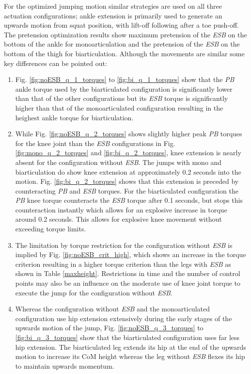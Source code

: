 \documentclass[letterpaper, 10 pt, conference]{ieeeconf}  %
\begin{document}
 For the optimized jumping motion similar strategies are used on all three actuation configurations; ankle extension is primarily used to generate an upwards motion from squat position, with lift-off following after a toe push-off. The pretension optimization results show maximum pretension of the \textit{ESB} on the bottom of the ankle for monoarticulation and the pretension of the \textit{ESB} on the bottom of the thigh for biarticulation. Although the movements are similar some key differences can be pointed out:
 \begin{enumerate}
 \item Fig. \ref{fig:noESB_q_1_torques} to \ref{fig:bi_q_1_torques} show that the \textit{PB} ankle torque used by the biarticulated configuration is significantly lower than that of the other configurations but its \textit{ESB} torque is significantly higher than that of the monoarticulated configuration resulting in the heighest ankle torque for biarticulation. 
 
\item While Fig. \ref{fig:noESB_q_2_torques} shows slightly higher peak \textit{PB} torques for the knee joint than the \textit{ESB} configurations in Fig. \ref{fig:mono_q_2_torques} and \ref{fig:bi_q_2_torques}, knee extension is nearly absent for the configuration without \textit{ESB}. The jumps with mono and biarticulation do show knee extension at approximately 0.2 seconds into the motion. Fig. \ref{fig:bi_q_2_torques} shows that this extension is preceded by counteracting \textit{PB} and \textit{ESB} torques. For the biarticulated configuration the \textit{PB} knee torque counteracts the \textit{ESB} torque after 0.1 seconds, but stops this counteraction instantly which allows for an explosive increase in torque around 0.2 seconds. This allows for explosive knee movement without exceeding torque limits.

\item The limitation by torque restriction for the configuration without \textit{ESB} is implied by Fig. \ref{fig:noESB_crit_high}, which shows an increase in the torque criterion resulting in a higher torque criterion than the legs with \textit{ESB} as shown in Table \ref{maxheight}. Restrictions in time and the number of control points may also be an influence on the moderate use of knee joint torque to execute the jump for the configuration without \textit{ESB}.

\item Whereas the configuration without \textit{ESB} and the monoarticulated configuration use hip extension extensively during the early stages of the upwards motion of the jump, Fig. \ref{fig:noESB_q_3_torques} to \ref{fig:bi_q_3_torques} show that the biarticulated configuration uses far less hip extension. The biarticulated leg extends its hip at the end of the upwards motion to increase its CoM height whereas the leg without \textit{ESB} flexes its hip to maintain upwards momentum.


\end{enumerate}
\end{document}
